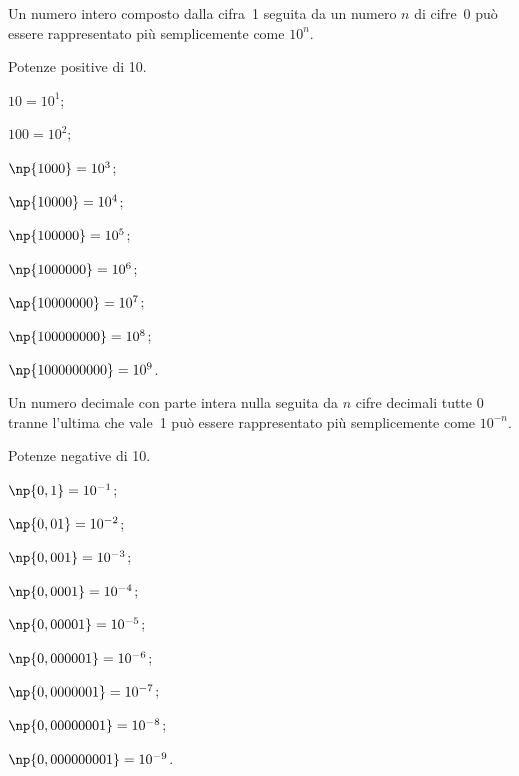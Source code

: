 \osservazione Un numero intero composto dalla cifra~1 seguita da un numero $n$ di cifre~0 può essere rappresentato più semplicemente come $10^n$.

\begin{exrig}
\begin{esempio}
 Potenze positive di 10.
\begin{multicols}{3}
\begin{enumeratea}
\item $10=10^1$;
\item $100=10^2$;
\item $\np{1000}=10^3$;
\item $\np{10000}=10^4$;
\item $\np{100000}=10^5$;
\item $\np{1000000}=10^6$;
\item $\np{10000000}=10^7$;
\item $\np{100000000}=10^8$;
\item $\np{1000000000}=10^9$.
\end{enumeratea}
\end{multicols}
\end{esempio}
\end{exrig}

\osservazione Un numero decimale con parte intera nulla seguita da $n$ cifre decimali tutte 0 tranne l'ultima che vale~1 può essere rappresentato più semplicemente come $10^{-n}$.

\pagebreak
\begin{exrig}
\begin{esempio}
 Potenze negative di 10.
\begin{multicols}{3}
\begin{enumeratea}
\item $\np{0,1}=10^{-1}$;
\item $\np{0,01}=10^{-2}$;
\item $\np{0,001}=10^{-3}$;
\item $\np{0,0001}=10^{-4}$;
\item $\np{0,00001}=10^{-5}$;
\item $\np{0,000001}=10^{-6}$;
\item $\np{0,0000001}=10^{-7}$;
\item $\np{0,00000001}=10^{-8}$;
\item $\np{0,000000001}=10^{-9}$.
\end{enumeratea}
\end{multicols}

\end{esempio}
\end{exrig}

